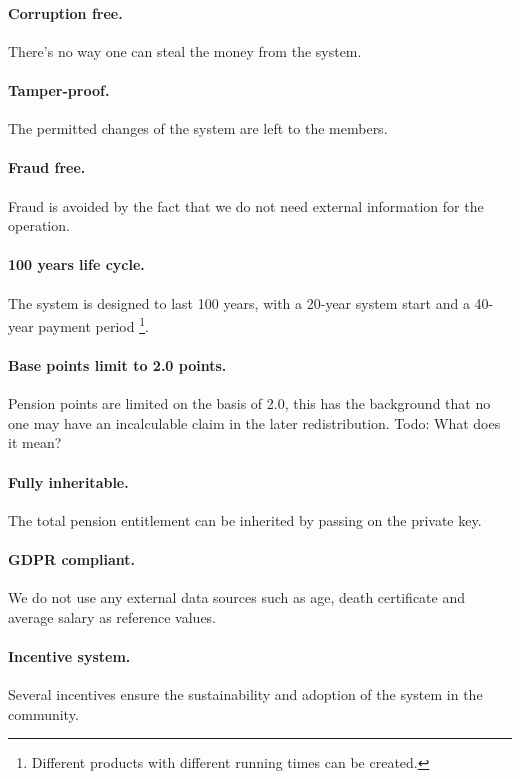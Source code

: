\paragraph{Corruption free.} There's no way one can steal the money from the system. 

\paragraph{Tamper-proof.} The permitted changes of the system are left to the members.

\paragraph{Fraud free.}
Fraud is avoided by the fact that we do not need external information for the operation. 

\paragraph{100 years life cycle.} 
The system is designed to last 100 years, with a 20-year system start and a 40-year payment period \footnote{ Different products with different running times can be created.}.  

\paragraph{Base points limit to 2.0 points.} 
Pension points are limited on the basis of 2.0, this has the background that no one may have an incalculable claim in the later redistribution. Todo: What does it mean?

\paragraph{Fully inheritable.}
The total pension entitlement can be inherited by passing on the private key.

\paragraph{GDPR compliant\cite{gdpr}.} 
We do not use any external data sources such as age, death certificate and average salary as reference values.

\paragraph{Incentive system.} 
Several incentives ensure the sustainability and adoption of the system in the community.


